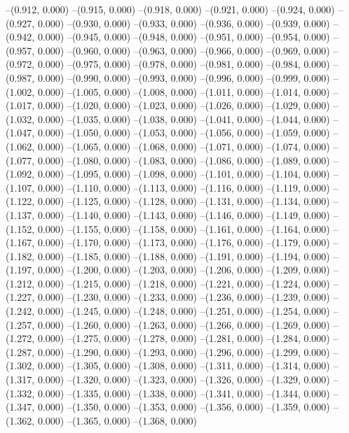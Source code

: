 {--(0.912, 0.000)
--(0.915, 0.000)
--(0.918, 0.000)
--(0.921, 0.000)
--(0.924, 0.000)
--(0.927, 0.000)
--(0.930, 0.000)
--(0.933, 0.000)
--(0.936, 0.000)
--(0.939, 0.000)
--(0.942, 0.000)
--(0.945, 0.000)
--(0.948, 0.000)
--(0.951, 0.000)
--(0.954, 0.000)
--(0.957, 0.000)
--(0.960, 0.000)
--(0.963, 0.000)
--(0.966, 0.000)
--(0.969, 0.000)
--(0.972, 0.000)
--(0.975, 0.000)
--(0.978, 0.000)
--(0.981, 0.000)
--(0.984, 0.000)
--(0.987, 0.000)
--(0.990, 0.000)
--(0.993, 0.000)
--(0.996, 0.000)
--(0.999, 0.000)
--(1.002, 0.000)
--(1.005, 0.000)
--(1.008, 0.000)
--(1.011, 0.000)
--(1.014, 0.000)
--(1.017, 0.000)
--(1.020, 0.000)
--(1.023, 0.000)
--(1.026, 0.000)
--(1.029, 0.000)
--(1.032, 0.000)
--(1.035, 0.000)
--(1.038, 0.000)
--(1.041, 0.000)
--(1.044, 0.000)
--(1.047, 0.000)
--(1.050, 0.000)
--(1.053, 0.000)
--(1.056, 0.000)
--(1.059, 0.000)
--(1.062, 0.000)
--(1.065, 0.000)
--(1.068, 0.000)
--(1.071, 0.000)
--(1.074, 0.000)
--(1.077, 0.000)
--(1.080, 0.000)
--(1.083, 0.000)
--(1.086, 0.000)
--(1.089, 0.000)
--(1.092, 0.000)
--(1.095, 0.000)
--(1.098, 0.000)
--(1.101, 0.000)
--(1.104, 0.000)
--(1.107, 0.000)
--(1.110, 0.000)
--(1.113, 0.000)
--(1.116, 0.000)
--(1.119, 0.000)
--(1.122, 0.000)
--(1.125, 0.000)
--(1.128, 0.000)
--(1.131, 0.000)
--(1.134, 0.000)
--(1.137, 0.000)
--(1.140, 0.000)
--(1.143, 0.000)
--(1.146, 0.000)
--(1.149, 0.000)
--(1.152, 0.000)
--(1.155, 0.000)
--(1.158, 0.000)
--(1.161, 0.000)
--(1.164, 0.000)
--(1.167, 0.000)
--(1.170, 0.000)
--(1.173, 0.000)
--(1.176, 0.000)
--(1.179, 0.000)
--(1.182, 0.000)
--(1.185, 0.000)
--(1.188, 0.000)
--(1.191, 0.000)
--(1.194, 0.000)
--(1.197, 0.000)
--(1.200, 0.000)
--(1.203, 0.000)
--(1.206, 0.000)
--(1.209, 0.000)
--(1.212, 0.000)
--(1.215, 0.000)
--(1.218, 0.000)
--(1.221, 0.000)
--(1.224, 0.000)
--(1.227, 0.000)
--(1.230, 0.000)
--(1.233, 0.000)
--(1.236, 0.000)
--(1.239, 0.000)
--(1.242, 0.000)
--(1.245, 0.000)
--(1.248, 0.000)
--(1.251, 0.000)
--(1.254, 0.000)
--(1.257, 0.000)
--(1.260, 0.000)
--(1.263, 0.000)
--(1.266, 0.000)
--(1.269, 0.000)
--(1.272, 0.000)
--(1.275, 0.000)
--(1.278, 0.000)
--(1.281, 0.000)
--(1.284, 0.000)
--(1.287, 0.000)
--(1.290, 0.000)
--(1.293, 0.000)
--(1.296, 0.000)
--(1.299, 0.000)
--(1.302, 0.000)
--(1.305, 0.000)
--(1.308, 0.000)
--(1.311, 0.000)
--(1.314, 0.000)
--(1.317, 0.000)
--(1.320, 0.000)
--(1.323, 0.000)
--(1.326, 0.000)
--(1.329, 0.000)
--(1.332, 0.000)
--(1.335, 0.000)
--(1.338, 0.000)
--(1.341, 0.000)
--(1.344, 0.000)
--(1.347, 0.000)
--(1.350, 0.000)
--(1.353, 0.000)
--(1.356, 0.000)
--(1.359, 0.000)
--(1.362, 0.000)
--(1.365, 0.000)
--(1.368, 0.000)
}
